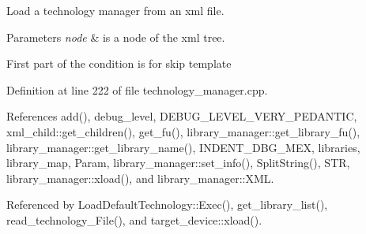 Load a technology manager from an xml file. 


\begin{DoxyParams}{Parameters}
{\em node} & is a node of the xml tree. \\
\hline
\end{DoxyParams}
First part of the condition is for skip template 

Definition at line 222 of file technology\+\_\+manager.\+cpp.



References add(), debug\+\_\+level, D\+E\+B\+U\+G\+\_\+\+L\+E\+V\+E\+L\+\_\+\+V\+E\+R\+Y\+\_\+\+P\+E\+D\+A\+N\+T\+IC, xml\+\_\+child\+::get\+\_\+children(), get\+\_\+fu(), library\+\_\+manager\+::get\+\_\+library\+\_\+fu(), library\+\_\+manager\+::get\+\_\+library\+\_\+name(), I\+N\+D\+E\+N\+T\+\_\+\+D\+B\+G\+\_\+\+M\+EX, libraries, library\+\_\+map, Param, library\+\_\+manager\+::set\+\_\+info(), Split\+String(), S\+TR, library\+\_\+manager\+::xload(), and library\+\_\+manager\+::\+X\+ML.



Referenced by Load\+Default\+Technology\+::\+Exec(), get\+\_\+library\+\_\+list(), read\+\_\+technology\+\_\+\+File(), and target\+\_\+device\+::xload().

